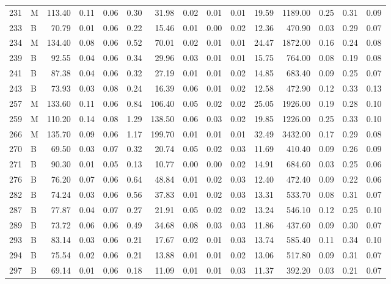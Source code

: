\begin{table}[ht]
\begin{tabular}{rlrrrrrrrrrrrrr}
  231 & M & 113.40 & 0.11 & 0.06 & 0.30 & 31.98 & 0.02 & 0.01 & 0.01 & 19.59 & 1189.00 & 0.25 & 0.31 & 0.09 \\ 
  233 & B & 70.79 & 0.01 & 0.06 & 0.22 & 15.46 & 0.01 & 0.00 & 0.02 & 12.36 & 470.90 & 0.03 & 0.29 & 0.07 \\ 
  234 & M & 134.40 & 0.08 & 0.06 & 0.52 & 70.01 & 0.02 & 0.01 & 0.01 & 24.47 & 1872.00 & 0.16 & 0.24 & 0.08 \\ 
  239 & B & 92.55 & 0.04 & 0.06 & 0.34 & 29.96 & 0.03 & 0.01 & 0.01 & 15.75 & 764.00 & 0.08 & 0.19 & 0.08 \\ 
  241 & B & 87.38 & 0.04 & 0.06 & 0.32 & 27.19 & 0.01 & 0.01 & 0.02 & 14.85 & 683.40 & 0.09 & 0.25 & 0.07 \\ 
  243 & B & 73.93 & 0.03 & 0.08 & 0.24 & 16.39 & 0.06 & 0.01 & 0.02 & 12.58 & 472.90 & 0.12 & 0.33 & 0.13 \\ 
  257 & M & 133.60 & 0.11 & 0.06 & 0.84 & 106.40 & 0.05 & 0.02 & 0.02 & 25.05 & 1926.00 & 0.19 & 0.28 & 0.10 \\ 
  259 & M & 110.20 & 0.14 & 0.08 & 1.29 & 138.50 & 0.06 & 0.03 & 0.02 & 19.85 & 1226.00 & 0.25 & 0.33 & 0.10 \\ 
  266 & M & 135.70 & 0.09 & 0.06 & 1.17 & 199.70 & 0.01 & 0.01 & 0.01 & 32.49 & 3432.00 & 0.17 & 0.29 & 0.08 \\ 
  270 & B & 69.50 & 0.03 & 0.07 & 0.32 & 20.74 & 0.05 & 0.02 & 0.03 & 11.69 & 410.40 & 0.09 & 0.26 & 0.09 \\ 
  271 & B & 90.30 & 0.01 & 0.05 & 0.13 & 10.77 & 0.00 & 0.00 & 0.02 & 14.91 & 684.60 & 0.03 & 0.25 & 0.06 \\ 
  276 & B & 76.20 & 0.07 & 0.06 & 0.64 & 48.84 & 0.01 & 0.02 & 0.03 & 12.40 & 472.40 & 0.09 & 0.22 & 0.06 \\ 
  282 & B & 74.24 & 0.03 & 0.06 & 0.56 & 37.83 & 0.01 & 0.02 & 0.03 & 13.31 & 533.70 & 0.08 & 0.31 & 0.07 \\ 
  287 & B & 77.87 & 0.04 & 0.07 & 0.27 & 21.91 & 0.05 & 0.02 & 0.02 & 13.24 & 546.10 & 0.12 & 0.25 & 0.10 \\ 
  289 & B & 73.72 & 0.06 & 0.06 & 0.49 & 34.68 & 0.08 & 0.03 & 0.03 & 11.86 & 437.60 & 0.09 & 0.30 & 0.07 \\ 
  293 & B & 83.14 & 0.03 & 0.06 & 0.21 & 17.67 & 0.02 & 0.01 & 0.03 & 13.74 & 585.40 & 0.11 & 0.34 & 0.10 \\ 
  294 & B & 75.54 & 0.02 & 0.06 & 0.21 & 13.88 & 0.01 & 0.01 & 0.02 & 13.06 & 517.80 & 0.09 & 0.31 & 0.07 \\ 
  297 & B & 69.14 & 0.01 & 0.06 & 0.18 & 11.09 & 0.01 & 0.01 & 0.03 & 11.37 & 392.20 & 0.03 & 0.21 & 0.07 \\ 

\end{tabular}
\end{table}
